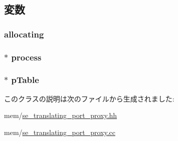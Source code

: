 \subsection{変数}
\hypertarget{classSETranslatingPortProxy_ad9ee84803e18a7cadad835ecc996515f}{
\subsubsection[{allocating}]{ {\bf allocating}}}
\label{classSETranslatingPortProxy_ad9ee84803e18a7cadad835ecc996515f}
\hypertarget{classSETranslatingPortProxy_a075e3da8f2570b13cecbbffca7e30d1a}{
\subsubsection[{process}]{$\ast$ {\bf process}}}
\label{classSETranslatingPortProxy_a075e3da8f2570b13cecbbffca7e30d1a}
\hypertarget{classSETranslatingPortProxy_ad14ffa23ad731f6003755b643f999049}{
\subsubsection[{pTable}]{$\ast$ {\bf pTable}}}
\label{classSETranslatingPortProxy_ad14ffa23ad731f6003755b643f999049}


このクラスの説明は次のファイルから生成されました:\begin{DoxyCompactItemize}
\item 
mem/\hyperlink{se__translating__port__proxy_8hh}{se\_\-translating\_\-port\_\-proxy.hh}\item 
mem/\hyperlink{se__translating__port__proxy_8cc}{se\_\-translating\_\-port\_\-proxy.cc}\end{DoxyCompactItemize}
